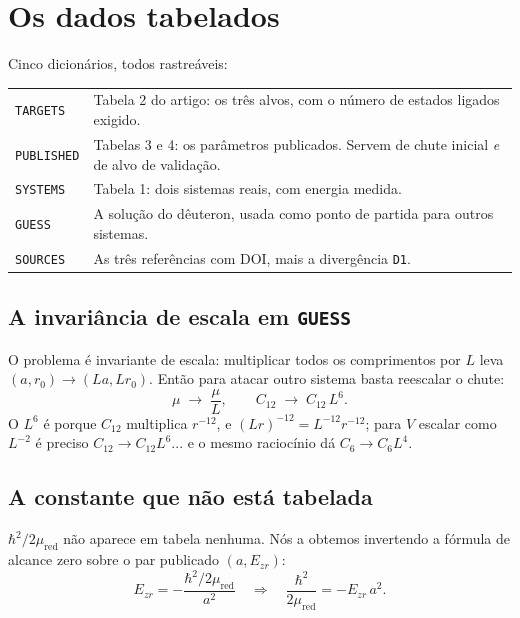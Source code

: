 \documentclass[11pt,a4paper]{article}
\begin{document}
\section{Os dados tabelados}
\label{sec:dados}

Cinco dicionários, todos rastreáveis:

\begin{center}
\begin{tabular}{lp{10.4cm}}
\toprule
\texttt{TARGETS} & Tabela 2 do artigo: os três alvos, com o número de estados ligados exigido. \\
\texttt{PUBLISHED} & Tabelas 3 e 4: os parâmetros publicados. Servem de chute inicial \emph{e} de alvo de validação. \\
\texttt{SYSTEMS} & Tabela 1: dois sistemas reais, com energia medida. \\
\texttt{GUESS} & A solução do dêuteron, usada como ponto de partida para outros sistemas. \\
\texttt{SOURCES} & As três referências com DOI, mais a divergência \texttt{D1}. \\
\bottomrule
\end{tabular}
\end{center}

\subsection{A invariância de escala em \texttt{GUESS}}

O problema é invariante de escala: multiplicar todos os comprimentos por $L$ leva
$(a, r_0)\to(La, Lr_0)$. Então para atacar outro sistema basta reescalar o chute:
\begin{equation}
  \mu \;\to\; \frac{\mu}{L}, \qquad C_{12} \;\to\; C_{12}\,L^6 .
\end{equation}
O $L^6$ é porque $C_{12}$ multiplica $r^{-12}$, e $(Lr)^{-12} = L^{-12}r^{-12}$;
para $V$ escalar como $L^{-2}$ é preciso $C_{12}\to C_{12}L^{6}$... e o mesmo
raciocínio dá $C_6 \to C_6 L^{4}$.

\subsection{A constante que não está tabelada}

$\hbar^2/2\mu_{\text{red}}$ não aparece em tabela nenhuma. Nós a obtemos
invertendo a fórmula de alcance zero sobre o par publicado $(a, E_{zr})$:
\begin{equation}
  E_{zr} = -\frac{\hbar^2/2\mu_{\text{red}}}{a^2}
  \quad\Longrightarrow\quad
  \frac{\hbar^2}{2\mu_{\text{red}}} = -E_{zr}\,a^2 .
\end{equation}
\end{document}

